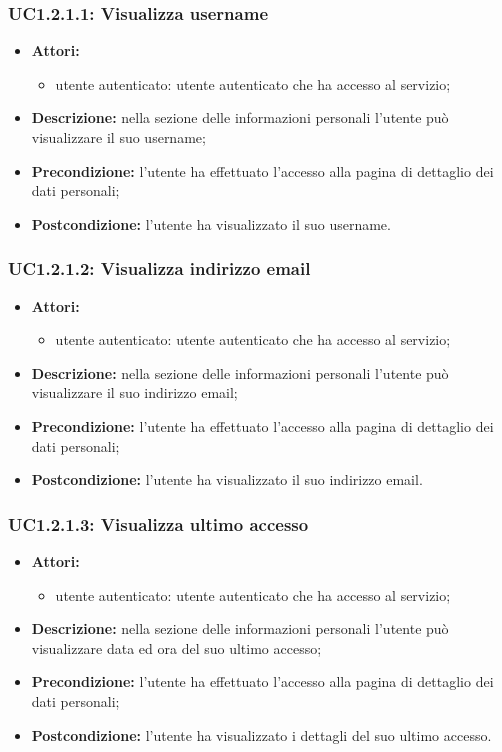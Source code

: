 \subsubsection{UC1.2.1.1: Visualizza username}

\begin{itemize}
	\item \textbf{Attori:}
	\begin{itemize}
		\item utente autenticato: utente autenticato che ha accesso al servizio;
	\end{itemize}
	\item \textbf{Descrizione:} nella sezione delle informazioni personali l'utente può visualizzare il suo username;
	\item \textbf{Precondizione:} l'utente ha effettuato l'accesso alla pagina di dettaglio dei dati personali;
	\item \textbf{Postcondizione:} l'utente ha visualizzato il suo username.
\end{itemize}

\subsubsection{UC1.2.1.2: Visualizza indirizzo email}

\begin{itemize}
	\item \textbf{Attori:}
	\begin{itemize}
		\item utente autenticato: utente autenticato che ha accesso al servizio;
	\end{itemize}
	\item \textbf{Descrizione:} nella sezione delle informazioni personali l'utente può visualizzare il suo indirizzo email;
	\item \textbf{Precondizione:} l'utente ha effettuato l'accesso alla pagina di dettaglio dei dati personali;
	\item \textbf{Postcondizione:} l'utente ha visualizzato il suo indirizzo email.
\end{itemize}

\subsubsection{UC1.2.1.3: Visualizza ultimo accesso}

\begin{itemize}
	\item \textbf{Attori:}
	\begin{itemize}
		\item utente autenticato: utente autenticato che ha accesso al servizio;
	\end{itemize}
	\item \textbf{Descrizione:} nella sezione delle informazioni personali l'utente può visualizzare data ed ora del suo ultimo accesso;
	\item \textbf{Precondizione:} l'utente ha effettuato l'accesso alla pagina di dettaglio dei dati personali;
	\item \textbf{Postcondizione:} l'utente ha visualizzato i dettagli del suo ultimo accesso.
\end{itemize}

